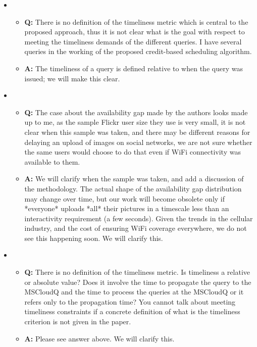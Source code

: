 \begin{itemize}
\item
\begin{itemize}
\item \textbf{Q: }There is no definition of the timeliness metric
  which is central to the proposed approach, thus it is not clear what
  is the goal with respect to meeting the timeliness demands of the
  different queries. I have several queries in the working of the
  proposed credit-based scheduling algorithm.
\item \textbf{A: } The timeliness of a query is defined relative to
  when the query was issued; we will make this clear.
\end{itemize}

\item
\begin{itemize}
\item \textbf{Q: } The case about the availability gap made by the
  authors looks made up to me, as the sample Flickr user size they use
  is very small, it is not clear when this sample was taken, and there
  may be different reasons for delaying an upload of images on social
  networks, we are not sure whether the same users would choose to do
  that even if WiFi connectivity was available to them.
\item \textbf{A: } We will clarify when the sample was taken, and
  add a discussion of the methodology. The actual shape of the
  availability gap distribution may change over time, but our work
  will become obsolete only if *everyone* uploads *all* their pictures
  in a timescale less than an interactivity requirement (a few
  seconds). Given the trends in the cellular industry, and the cost of
  ensuring WiFi coverage everywhere, we do not see this happening soon.
  We will clarify this.
\end{itemize}
    
\item
\begin{itemize}
\item \textbf{Q: }There is no definition of the timeliness metric.  Is
  timeliness a relative or absolute value?  Does it involve the time
  to propagate the query to the MSCloudQ and the time to process the
  queries at the MSCloudQ or it refers only to the propagation time?
  You cannot talk about meeting timeliness constraints if a concrete
  definition of what is the timeliness criterion is not given in the
  paper.
\item \textbf{A: } Please see answer above. We will clarify this.
\end{itemize}


\end{itemize}

